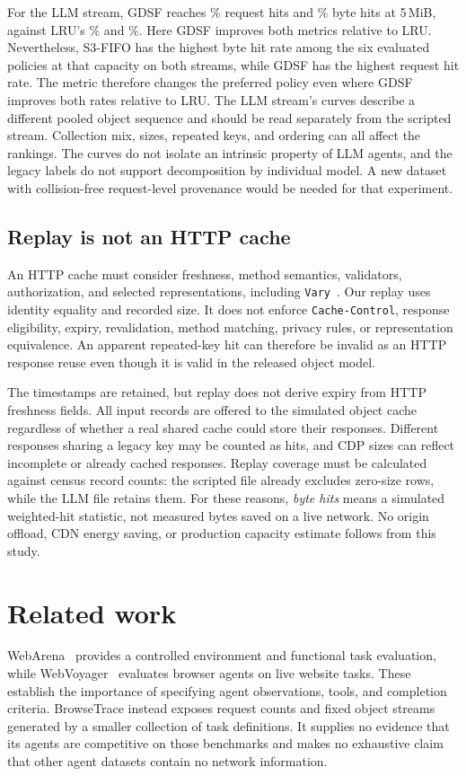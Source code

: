 \documentclass[10pt,sigconf,nonacm]{acmart}
\newcommand{\sysname}{BrowseTrace\xspace}
\newcommand{\mib}{\,MiB\xspace}
\begin{document}
For the LLM stream, GDSF reaches \BTLLMGDSFRequestPct\% request hits and \BTLLMGDSFBytePct\% byte hits at 5\mib, against LRU's \BTLLMLRURequestPct\% and \BTLLMLRUBytePct\%. Here GDSF improves both metrics relative to LRU. Nevertheless, S3-FIFO has the highest byte hit rate among the six evaluated policies at that capacity on both streams, while GDSF has the highest request hit rate. The metric therefore changes the preferred policy even where GDSF improves both rates relative to LRU. The LLM stream's curves describe a different pooled object sequence and should be read separately from the scripted stream. Collection mix, sizes, repeated keys, and ordering can all affect the rankings. The curves do not isolate an intrinsic property of LLM agents, and the legacy labels do not support decomposition by individual model. A new dataset with collision-free request-level provenance would be needed for that experiment.

\subsection{Replay is not an HTTP cache}
An HTTP cache must consider freshness, method semantics, validators, authorization, and selected representations, including \texttt{Vary}~\cite{rfc9111}. Our replay uses identity equality and recorded size. It does not enforce \texttt{Cache-Control}, response eligibility, expiry, revalidation, method matching, privacy rules, or representation equivalence. An apparent repeated-key hit can therefore be invalid as an HTTP response reuse even though it is valid in the released object model.

The timestamps are retained, but replay does not derive expiry from HTTP freshness fields. All input records are offered to the simulated object cache regardless of whether a real shared cache could store their responses. Different responses sharing a legacy key may be counted as hits, and CDP sizes can reflect incomplete or already cached responses. Replay coverage must be calculated against census record counts: the scripted file already excludes zero-size rows, while the LLM file retains them. For these reasons, \emph{byte hits} means a simulated weighted-hit statistic, not measured bytes saved on a live network. No origin offload, CDN energy saving, or production capacity estimate follows from this study.

\section{Related work}
\label{sec:related}
WebArena~\cite{webarena} provides a controlled environment and functional task evaluation, while WebVoyager~\cite{webvoyager} evaluates browser agents on live website tasks. These establish the importance of specifying agent observations, tools, and completion criteria. \sysname instead exposes request counts and fixed object streams generated by a smaller collection of task definitions. It supplies no evidence that its agents are competitive on those benchmarks and makes no exhaustive claim that other agent datasets contain no network information.
\end{document}
